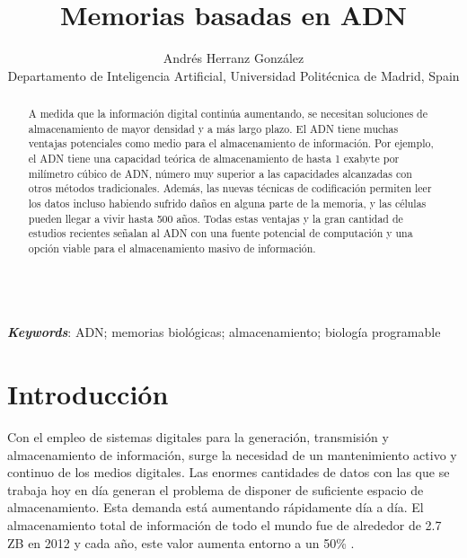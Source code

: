 \documentclass[a4paper,11pt]{article}
\begin{document}
\title{Memorias basadas en ADN}


\author{{Andr\'es Herranz Gonz\'alez}\\
{\small Departamento de Inteligencia Artificial, Universidad Polit\'ecnica de Madrid, Spain}}

\date{}
\maketitle



\begin{abstract}

A medida que la información digital continúa aumentando, se necesitan soluciones de almacenamiento de mayor densidad y a más largo plazo. El ADN tiene muchas ventajas potenciales como medio para el almacenamiento de información. Por ejemplo, el ADN tiene una capacidad teórica de almacenamiento de hasta 1 exabyte por milímetro cúbico de ADN, número muy superior a las capacidades alcanzadas con otros métodos tradicionales. Además, las nuevas técnicas de codificación permiten leer los datos incluso habiendo sufrido daños en alguna parte de la memoria, y las células pueden llegar a vivir hasta 500 años. Todas estas ventajas y la gran cantidad de estudios recientes señalan al ADN con una fuente potencial de computación y una opción viable para el almacenamiento masivo de información.

\end{abstract}


\ \\
\textbf{\textit{Keywords}}: ADN; memorias biológicas; almacenamiento; biología programable


\section{Introducción}

Con el empleo de sistemas digitales para la generación, transmisión y almacenamiento de información, surge la necesidad de un mantenimiento activo y continuo de los medios digitales. Las enormes cantidades de datos con las que se trabaja hoy en día generan el problema de disponer de suficiente espacio de almacenamiento. Esta demanda está aumentando rápidamente día a día. El almacenamiento total de información de todo el mundo fue de alrededor de 2.7 ZB en 2012 y cada año, este valor aumenta entorno a un 50\% \citep{Hakami2015}.
\end{document}
